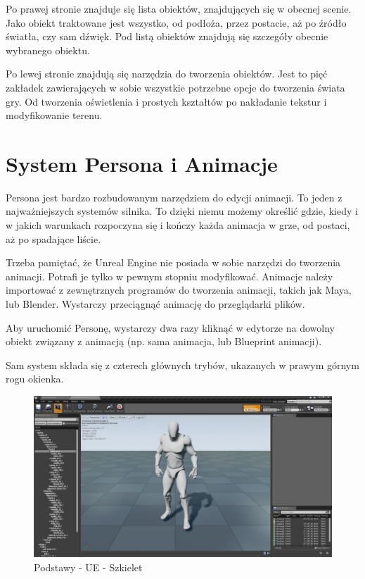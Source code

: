 \documentclass[openright]{xmgr}
\begin{document}
Po prawej stronie znajduje się lista obiektów, znajdujących się w obecnej scenie. Jako obiekt traktowane jest wszystko, od podłoża, przez postacie, aż po źródło światła, czy sam dźwięk.
Pod listą obiektów znajdują się szczegóły obecnie wybranego obiektu.

Po lewej stronie znajdują się narzędzia do tworzenia obiektów. Jest to pięć zakładek zawierających w sobie wszystkie potrzebne opcje do tworzenia świata gry. Od tworzenia oświetlenia i prostych kształtów po nakładanie tekstur i modyfikowanie terenu.

\section{System Persona i Animacje}
Persona jest bardzo rozbudowanym narzędziem do edycji animacji. To jeden z najważniejszych systemów silnika. To dzięki niemu możemy określić gdzie, kiedy i w jakich warunkach  rozpoczyna się i kończy każda animacja w grze, od postaci, aż po spadające liście.

Trzeba pamiętać, że Unreal Engine nie posiada w sobie narzędzi do tworzenia animacji. Potrafi je tylko w pewnym stopniu modyfikować. Animacje należy importować z zewnętrznych programów do tworzenia animacji, takich jak Maya, lub Blender. Wystarczy przeciągnąć animację do przeglądarki plików.

Aby uruchomić Personę, wystarczy dwa razy kliknąć w edytorze na dowolny obiekt związany z animacją (np. sama animacja, lub Blueprint animacji).

Sam system składa się z czterech głównych trybów, ukazanych w prawym górnym rogu okienka.

\begin{figure}[!htb]
    \begin{center}
    \includegraphics[scale=0.25]{Screeny/Skeleton}
    \end{center}
    \caption{Podstawy - UE - Szkielet}
\end{figure}
\end{document}

